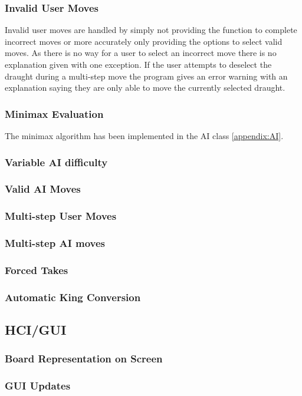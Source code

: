 \documentclass[a4paper,12pt]{scrartcl}
\begin{document}
{{			\subsubsection{Invalid User Moves}{Invalid user moves are handled by simply not providing the function to complete incorrect moves or more accurately only providing the options to select valid moves. As there is no way for a user to select an incorrect move there is no explanation given with one exception. If the user attempts to deselect the draught during a multi-step move the program gives an error warning with an explanation saying they are only able to move the currently selected draught.
			}
			\subsubsection{Minimax Evaluation}{
				The minimax algorithm has been implemented in the AI class \cref{appendix:AI}.
			}
			\subsubsection{Variable AI difficulty}{}
			\subsubsection{Valid AI Moves}{}
			\subsubsection{Multi-step User Moves}{}
			\subsubsection{Multi-step AI moves}{}
			\subsubsection{Forced Takes}{}
			\subsubsection{Automatic King Conversion}{}
		}
		\subsection{HCI/GUI}
		{
			\subsubsection{Board Representation on Screen}{}
			\subsubsection{GUI Updates}{}
}}
\end{document}
